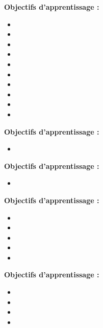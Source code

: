 \par\noindent\textbf{Objectifs d'apprentissage :}
\begin{itemize}
    \item \useobj[C4D3ab]
    \item \useobj[C4D3ac]
    \item \useobj[C4D3ba]
    \item \useobj[C4D3bb]
    \item \useobj[C4D3bc]
    \item \useobj[C4D3bd]
    \item \useobj[C4D3be]
    \item \useobj[C4D3bf]
    \item \useobj[C4D3bg]
    \item \useobj[C4D3bh]
\end{itemize}
\endsequence

\par\noindent\textbf{Objectifs d'apprentissage :}
\begin{itemize}
    \item \useobj[C4B3cb]
\end{itemize}
\endsequence

\par\noindent\textbf{Objectifs d'apprentissage :}
\begin{itemize}
    \item \useobj[C4B3ca]
\end{itemize}
\endsequence

\par\noindent\textbf{Objectifs d'apprentissage :}
\begin{itemize}
    \item \useobj[C4A3ab]
    \item \useobj[C4A3ba]
    \item \useobj[C4A3bb]
    \item \useobj[C4A3bc]
    \item \useobj[C4A3bd]
\end{itemize}
\endsequence

\par\noindent\textbf{Objectifs d'apprentissage :}
\begin{itemize}
    \item \useobj[C4B3da]
    \item \useobj[C4B3db]
    \item \useobj[C4B3dc]
    \item \useobj[C4B3dd]
\end{itemize}
\endsequence

